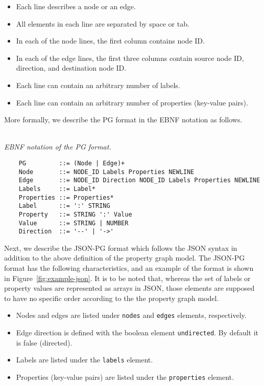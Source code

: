 \documentclass[runningheads]{llncs}
\begin{document}
\begin{itemize}
    \item Each line describes a node or an edge.
    \item All elements in each line are separated by space or tab.
    \item In each of the node lines, the first column contains node ID.
    \item In each of the edge lines, the first three columns contain source node ID, direction, and destination node ID.
    \item Each line can contain an arbitrary number of labels.
    \item Each line can contain an arbitrary number of properties (key-value pairs).
\end{itemize}

More formally, we describe the PG format in the EBNF notation as follows.

\begin{defi}[PG Format]
\leavevmode \vspace{1mm} \\
\emph{EBNF notation of the PG format.}
\begin{scriptsize}
\begin{verbatim}
    PG         ::= (Node | Edge)+
    Node       ::= NODE_ID Labels Properties NEWLINE
    Edge       ::= NODE_ID Direction NODE_ID Labels Properties NEWLINE
    Labels     ::= Label*
    Properties ::= Properties*
    Label      ::= ':' STRING
    Property   ::= STRING ':' Value
    Value      ::= STRING | NUMBER
    Direction  ::= '--' | '->'
\end{verbatim}
\end{scriptsize}
\end{defi}

Next, we describe the JSON-PG format which follows the JSON syntax in addition to the above definition of the property graph model. The JSON-PG format has the following characteristics, and an example of the format is shown in Figure~\ref{fig:example-json}. It is to be noted that, whereas the set of labels or property values are represented as arrays in JSON, those elements are supposed to have no specific order according to the the property graph model.

\begin{itemize}
    \item Nodes and edges are listed under \texttt{nodes} and \texttt{edges} elements, respectively.
    \item Edge direction is defined with the boolean element \texttt{undirected}. By default it is false (directed).
    \item Labels are listed under the \texttt{labels} element.
    \item Properties (key-value pairs) are listed under the \texttt{properties} element.
\end{itemize}
\end{document}
